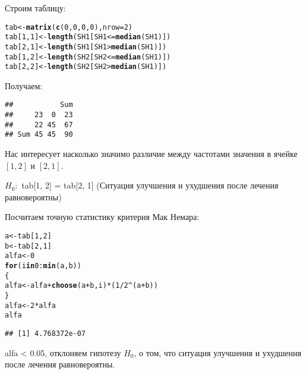 \documentclass{article}\usepackage[]{graphicx}\usepackage[]{color}
\makeatletter
\newcommand{\hlnum}[1]{\textcolor[rgb]{0.686,0.059,0.569}{#1}}%
\newcommand{\hlopt}[1]{\textcolor[rgb]{0,0,0}{#1}}%
\newcommand{\hlstd}[1]{\textcolor[rgb]{0.345,0.345,0.345}{#1}}%
\newcommand{\hlkwa}[1]{\textcolor[rgb]{0.161,0.373,0.58}{\textbf{#1}}}%
\newcommand{\hlkwb}[1]{\textcolor[rgb]{0.69,0.353,0.396}{#1}}%
\newcommand{\hlkwc}[1]{\textcolor[rgb]{0.333,0.667,0.333}{#1}}%
\newcommand{\hlkwd}[1]{\textcolor[rgb]{0.737,0.353,0.396}{\textbf{#1}}}%
\newenvironment{kframe}{%
 \def\at@end@of@kframe{}%
 \ifinner\ifhmode%
  \def\at@end@of@kframe{\end{minipage}}%
  \begin{minipage}{\columnwidth}%
 \fi\fi%
 \def\FrameCommand##1{\hskip\@totalleftmargin \hskip-\fboxsep
 \colorbox{shadecolor}{##1}\hskip-\fboxsep
     \hskip-\linewidth \hskip-\@totalleftmargin \hskip\columnwidth}%
 \MakeFramed {\advance\hsize-\width
   \@totalleftmargin\z@ \linewidth\hsize
   \@setminipage}}%
 {\par\unskip\endMakeFramed%
 \at@end@of@kframe}
\newenvironment{knitrout}{}{} %
\makeatother
\begin{document}
Строим таблицу:
\begin{knitrout}
\color{fgcolor}\begin{kframe}
\begin{alltt}
\hlstd{tab} \hlkwb{<-} \hlkwd{matrix}\hlstd{(}\hlkwd{c}\hlstd{(}\hlnum{0}\hlstd{,} \hlnum{0}\hlstd{,} \hlnum{0}\hlstd{,} \hlnum{0}\hlstd{),} \hlkwc{nrow} \hlstd{=} \hlnum{2}\hlstd{)}
\hlstd{tab[}\hlnum{1}\hlstd{,} \hlnum{1}\hlstd{]} \hlkwb{<-} \hlkwd{length}\hlstd{(SH1[SH1} \hlopt{<=} \hlkwd{median}\hlstd{(SH1)])}
\hlstd{tab[}\hlnum{2}\hlstd{,} \hlnum{1}\hlstd{]} \hlkwb{<-} \hlkwd{length}\hlstd{(SH1[SH1} \hlopt{>} \hlkwd{median}\hlstd{(SH1)])}
\hlstd{tab[}\hlnum{1}\hlstd{,} \hlnum{2}\hlstd{]} \hlkwb{<-} \hlkwd{length}\hlstd{(SH2[SH2} \hlopt{<=} \hlkwd{median}\hlstd{(SH1)])}
\hlstd{tab[}\hlnum{2}\hlstd{,} \hlnum{2}\hlstd{]} \hlkwb{<-} \hlkwd{length}\hlstd{(SH2[SH2} \hlopt{>} \hlkwd{median}\hlstd{(SH1)])}
\end{alltt}
\end{kframe}
\end{knitrout}
Получаем:
\begin{knitrout}
\color{fgcolor}\begin{kframe}
\begin{verbatim}
##           Sum
##     23  0  23
##     22 45  67
## Sum 45 45  90
\end{verbatim}
\end{kframe}
\end{knitrout}
Нас интересует насколько значимо различие между частотами значения в ячейке $[1, 2]$ и $[2, 1]$.

$H_0:$ tab[1, 2] = tab[2, 1] (Ситуация улучшения и ухудшения после лечения равновероятны)

Посчитаем точную статистику критерия Мак Немара:
\begin{knitrout}
\color{fgcolor}\begin{kframe}
\begin{alltt}
\hlstd{a} \hlkwb{<-} \hlstd{tab[}\hlnum{1}\hlstd{,} \hlnum{2}\hlstd{]}
\hlstd{b} \hlkwb{<-} \hlstd{tab[}\hlnum{2}\hlstd{,} \hlnum{1}\hlstd{]}
\hlstd{alfa} \hlkwb{<-} \hlnum{0}
\hlkwa{for} \hlstd{(i} \hlkwa{in} \hlnum{0}\hlopt{:}\hlkwd{min}\hlstd{(a, b))}
\hlstd{\{}
  \hlstd{alfa} \hlkwb{<-} \hlstd{alfa} \hlopt{+} \hlkwd{choose}\hlstd{(a} \hlopt{+} \hlstd{b, i)} \hlopt{*} \hlstd{(}\hlnum{1} \hlopt{/} \hlnum{2}\hlopt{^}\hlstd{(a} \hlopt{+} \hlstd{b))}
\hlstd{\}}
\hlstd{alfa} \hlkwb{<-} \hlnum{2} \hlopt{*} \hlstd{alfa}
\hlstd{alfa}
\end{alltt}
\begin{verbatim}
## [1] 4.768372e-07
\end{verbatim}
\end{kframe}
\end{knitrout}
alfa < 0.05, отклоняем гипотезу $H_0$, о том, что ситуация улучшения и ухудшения после лечения равновероятны.
\end{document}
